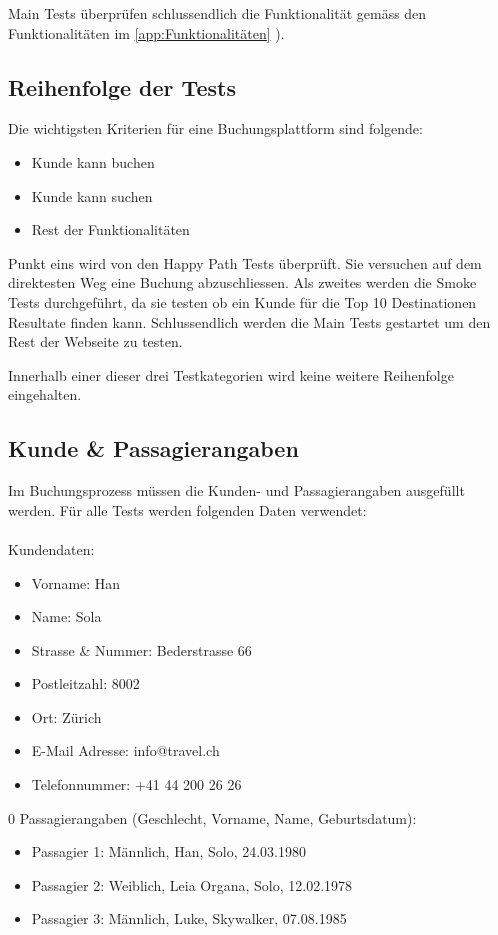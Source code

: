 Main Tests überprüfen schlussendlich die Funktionalität gemäss den Funktionalitäten im \cref{app:Funktionalitäten} ).

\subsection{Reihenfolge der Tests}
Die wichtigsten Kriterien für eine Buchungsplattform sind folgende:
\begin{itemize}
\item Kunde kann buchen
\item Kunde kann suchen
\item Rest der Funktionalitäten
\end{itemize}
Punkt eins wird von den Happy Path Tests überprüft. Sie versuchen auf dem direktesten Weg eine Buchung abzuschliessen. Als zweites werden die Smoke Tests durchgeführt, da sie testen ob ein Kunde für die Top 10 Destinationen Resultate finden kann. Schlussendlich werden die Main Tests gestartet um den Rest der Webseite zu testen.

Innerhalb einer dieser drei Testkategorien wird keine weitere Reihenfolge eingehalten.

\subsection{Kunde \& Passagierangaben}
\label{sec:Konzept:Übersicht:Angaben}
Im Buchungsprozess müssen die Kunden- und Passagierangaben ausgefüllt werden. Für alle Tests werden folgenden Daten verwendet:\\
\\  
Kundendaten:
\begin{itemize}
\item Vorname: Han
\item Name: Sola
\item Strasse \& Nummer: Bederstrasse 66
\item Postleitzahl: 8002
\item Ort: Zürich
\item E-Mail Adresse: info@travel.ch
\item Telefonnummer: +41 44 200 26 26 
\end{itemize}

\begin{addmargin*}[0cm]{0\marginwidth}
Passagierangaben (Geschlecht, Vorname, Name, Geburtsdatum):
	\begin{itemize}
	\item Passagier 1: Männlich, Han, Solo, 24.03.1980
	\item Passagier 2: Weiblich, Leia Organa, Solo, 12.02.1978
	\item Passagier 3: Männlich, Luke, Skywalker, 07.08.1985
	\end{itemize}
\end{addmargin*}


